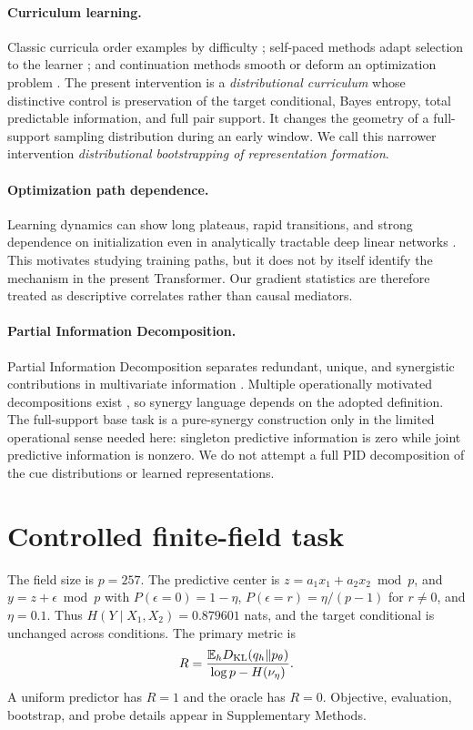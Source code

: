 \documentclass[11pt]{article}
\begin{document}
\paragraph{Curriculum learning.}
Classic curricula order examples by difficulty
\cite{bengio2009curriculum,hacohen2019curriculum}; self-paced methods adapt
selection to the learner \cite{jiang2015selfpaced}; and continuation methods
smooth or deform an optimization problem \cite{mobahi2016diffusion}. The
present intervention is a \emph{distributional curriculum} whose distinctive
control is preservation of the target conditional, Bayes entropy, total
predictable information, and full pair support. It changes the geometry of a
full-support sampling distribution during an early window. We call this
narrower intervention \emph{distributional bootstrapping of representation
formation}.

\paragraph{Optimization path dependence.}
Learning dynamics can show long plateaus, rapid transitions, and strong
dependence on initialization even in analytically tractable deep linear
networks \cite{saxe2014exact}. This motivates studying training paths, but it
does not by itself identify the mechanism in the present Transformer. Our
gradient statistics are therefore treated as descriptive correlates rather
than causal mediators.

\paragraph{Partial Information Decomposition.}
Partial Information Decomposition separates redundant, unique, and
synergistic contributions in multivariate information
\cite{williams2010pid}. Multiple operationally motivated decompositions
exist \cite{bertschinger2014unique}, so synergy language depends on the
adopted definition. The full-support base task is a pure-synergy construction
only in the limited operational sense needed here: singleton predictive
information is zero while joint predictive information is nonzero. We do not
attempt a full PID decomposition of the cue distributions or learned
representations.

\section{Controlled finite-field task}
The field size is $p=257$. The predictive center is
$z=a_1x_1+a_2x_2 \bmod p$, and $y=z+\epsilon \bmod p$ with
$P(\epsilon=0)=1-\eta$, $P(\epsilon=r)=\eta/(p-1)$ for $r\ne0$, and
$\eta=0.1$. Thus $H(Y\mid X_1,X_2)=0.879601$ nats, and the
target conditional is unchanged across conditions. The primary metric is
\[
R=\frac{\mathbb{E}_h D_{\rm KL}(q_h\Vert p_\theta)}
{\log p-H(\nu_\eta)}.
\]
A uniform predictor has $R=1$ and the oracle has $R=0$. Objective,
evaluation, bootstrap, and probe details appear in Supplementary Methods.
\end{document}
